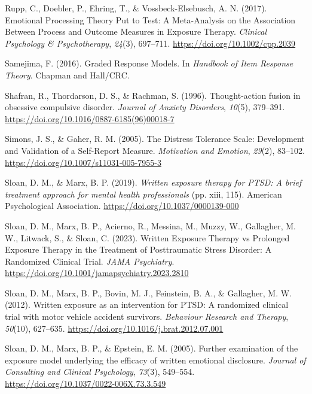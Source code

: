 \documentclass[
  man,floatsintext]{apa7}
\newlength{\cslhangindent}
\newlength{\cslentryspacingunit} %
\newenvironment{CSLReferences}[2] %
 {%
  \setlength{\parindent}{0pt}
  \ifodd #1
  \let\oldpar\par
  \def\par{\hangindent=\cslhangindent\oldpar}
  \fi
  \setlength{\parskip}{#2\cslentryspacingunit}
 }%
 {}
\begin{document}
\begin{CSLReferences}{1}{0}
\leavevmode{}%
Rupp, C., Doebler, P., Ehring, T., \& Vossbeck-Elsebusch, A. N. (2017). Emotional Processing Theory Put to Test: A Meta-Analysis on the Association Between Process and Outcome Measures in Exposure Therapy. \emph{Clinical Psychology \& Psychotherapy}, \emph{24}(3), 697--711. \url{https://doi.org/10.1002/cpp.2039}

\leavevmode{}%
Samejima, F. (2016). Graded Response Models. In \emph{Handbook of Item Response Theory}. Chapman and Hall/CRC.

\leavevmode{}%
Shafran, R., Thordarson, D. S., \& Rachman, S. (1996). Thought-action fusion in obsessive compulsive disorder. \emph{Journal of Anxiety Disorders}, \emph{10}(5), 379--391. \url{https://doi.org/10.1016/0887-6185(96)00018-7}

\leavevmode{}%
Simons, J. S., \& Gaher, R. M. (2005). The Distress Tolerance Scale: Development and Validation of a Self-Report Measure. \emph{Motivation and Emotion}, \emph{29}(2), 83--102. \url{https://doi.org/10.1007/s11031-005-7955-3}

\leavevmode{}%
Sloan, D. M., \& Marx, B. P. (2019). \emph{Written exposure therapy for PTSD: A brief treatment approach for mental health professionals} (pp. xiii, 115). American Psychological Association. \url{https://doi.org/10.1037/0000139-000}

\leavevmode{}%
Sloan, D. M., Marx, B. P., Acierno, R., Messina, M., Muzzy, W., Gallagher, M. W., Litwack, S., \& Sloan, C. (2023). Written Exposure Therapy vs Prolonged Exposure Therapy in the Treatment of Posttraumatic Stress Disorder: A Randomized Clinical Trial. \emph{JAMA Psychiatry}. \url{https://doi.org/10.1001/jamapsychiatry.2023.2810}

\leavevmode{}%
Sloan, D. M., Marx, B. P., Bovin, M. J., Feinstein, B. A., \& Gallagher, M. W. (2012). Written exposure as an intervention for PTSD: A randomized clinical trial with motor vehicle accident survivors. \emph{Behaviour Research and Therapy}, \emph{50}(10), 627--635. \url{https://doi.org/10.1016/j.brat.2012.07.001}

\leavevmode{}%
Sloan, D. M., Marx, B. P., \& Epstein, E. M. (2005). Further examination of the exposure model underlying the efficacy of written emotional disclosure. \emph{Journal of Consulting and Clinical Psychology}, \emph{73}(3), 549--554. \url{https://doi.org/10.1037/0022-006X.73.3.549}


\end{CSLReferences}
\end{document}
